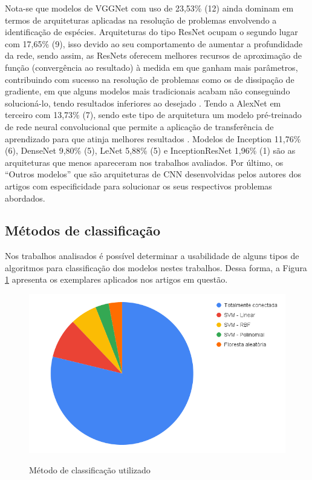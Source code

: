 \documentclass[
	12pt,				%
	oneside,			%
	a4paper,			%
	english,			%
	brazil				%
	]{abntex2ppgsi}
\begin{document}
Nota-se que modelos de VGGNet com uso de 23,53\% (12) ainda dominam em termos de arquiteturas aplicadas na resolução de problemas envolvendo a identificação de espécies. Arquiteturas do tipo ResNet ocupam o segundo lugar com 17,65\% (9), isso devido ao seu comportamento de aumentar a profundidade da rede, sendo assim, as ResNets oferecem melhores recursos de aproximação de função (convergência ao resultado) à medida em que ganham mais parâmetros, contribuindo com sucesso na resolução de problemas como os de dissipação de gradiente, em que alguns modelos mais tradicionais acabam não conseguindo solucioná-lo, tendo resultados inferiores ao desejado \cite{sun2017deep}. Tendo a AlexNet em terceiro com 13,73\% (7), sendo este tipo de arquitetura um modelo pré-treinado de rede neural convolucional que permite a aplicação de transferência de aprendizado para que atinja melhores resultados \cite{hongclassification}. Modelos de Inception 11,76\% (6), DenseNet 9,80\% (5), LeNet 5,88\% (5) e InceptionResNet 1,96\% (1) são as arquiteturas que menos apareceram nos trabalhos avaliados. Por último, os ``Outros modelos'' que são arquiteturas de CNN desenvolvidas pelos autores dos artigos com especificidade para solucionar os seus respectivos problemas abordados.

\subsection{Métodos de classificação}
Nos trabalhos analisados é possível determinar a usabilidade de alguns tipos de algoritmos para classificação dos modelos nestes trabalhos. Dessa forma, a Figura \ref{fig:grafico_classificador_vs_uso} apresenta os exemplares aplicados nos artigos em questão.

\begin{figure}[H]
    \centering
    \caption{Método de classificação utilizado}
    \includegraphics[width=1.0\textwidth]{imagens/revisao_sistematica/grafico_classificador_vs_uso.png}
    \label{fig:grafico_classificador_vs_uso}
\end{figure}
\end{document}
